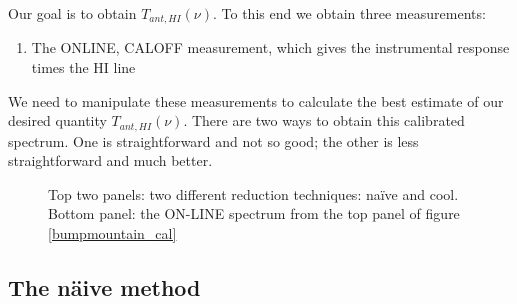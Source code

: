 	Our goal is to obtain $T_{ant, HI}(\nu)$. To this end we obtain
three measurements: \begin{enumerate}

\item The ONLINE, CALOFF measurement, which gives the instrumental
response times the HI line

\end{enumerate}

	We need to manipulate these measurements to calculate the best
estimate of our desired quantity $T_{ant,HI}(\nu)$.  There are two ways
to obtain this calibrated spectrum. One is straightforward and not so
good; the other is less straightforward and much better.

\begin{figure}[p!]
\begin{center}
\leavevmode
\epsfxsize=5in
\end{center}

\caption{ Top two panels: two different reduction techniques: na\"ive
and cool. Bottom panel: the ON-LINE spectrum from the top panel of
figure \ref{bumpmountain_cal} \label{bmp_cal}}

\end{figure}

\subsection{The n\"aive method}

